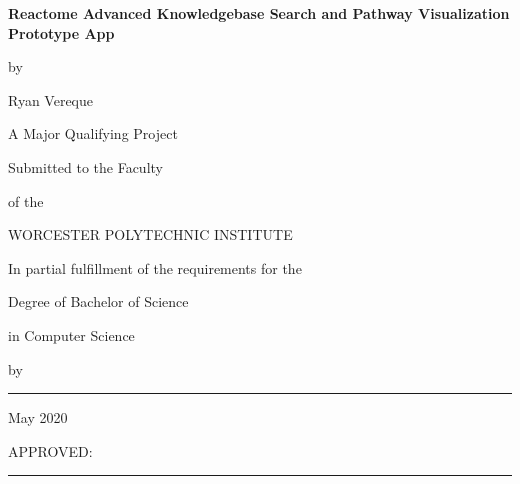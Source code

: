 \documentclass[12pt]{report}
\begin{document}
	
\sloppy

%


%
\newcommand{\brk}{\vspace*{0.18in}}

\thispagestyle{empty}

\begin{center}

\brk


   {\large 
	\textbf{
	 Reactome Advanced Knowledgebase Search and Pathway Visualization Prototype App
	}
   }


\brk
by

\brk
Ryan Vereque

\brk\brk
A Major Qualifying Project

\brk
Submitted to the Faculty

\brk
of the 

\brk
WORCESTER POLYTECHNIC INSTITUTE
	
\brk
In partial fulfillment of the requirements for the

\brk
Degree of Bachelor of Science

\brk
in Computer Science

\brk


\brk
by

\brk\brk
\rule{3in}{1.2pt}

\brk
May 2020

\end{center}

	
\vfill
APPROVED:

\vspace{0.5in}
\rule{3in}{0.8pt}
\end{document}
